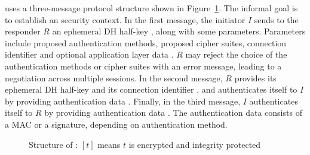 
%
\mEdhoc{} uses a three-message protocol structure
shown in Figure~\ref{fig:edhocFramework}.
%
The informal goal is to establish an \mOscore{} security context.
%
In the first message, the initiator $I$ sends to the responder $R$ an
ephemeral DH half-key \mGx{}, along with some parameters.
%
Parameters include proposed \mEdhoc{} authentication methods, proposed cipher
suites, connection identifier \mCi{} and optional application layer data \mADone.
%
$R$ may reject the choice of the authentication methods
or cipher suites with an error message, leading to a negotiation across
multiple \mEdhoc{} sessions.
%
In the second message, $R$ provides its ephemeral
DH half-key \mGy{} and its connection identifier \mCr, and authenticates itself
to $I$ by providing authentication data \mAuthr{}.
%
Finally, in the third message, $I$ authenticates itself
to $R$ by providing authentication data \mAuthi{}.
%
The authentication data consists of a MAC or a signature, depending on
authentication method.
%
%
%
\begin{figure}
\centering
{}
\caption{Structure of \mEdhoc{}: $[t]$ means $t$ is encrypted and integrity protected}
\label{fig:edhocFramework}
\end{figure}

